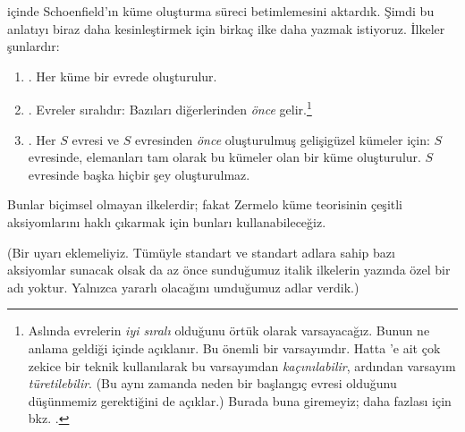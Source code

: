 


 içinde Schoenfield'ın küme oluşturma süreci
betimlemesini aktardık. Şimdi bu anlatıyı biraz daha kesinleştirmek için
birkaç ilke daha yazmak istiyoruz. İlkeler şunlardır:
\begin{enumerate}
\item[] \stageshier. Her küme bir evrede oluşturulur.
\item[] \stagesord. Evreler sıralıdır: Bazıları diğerlerinden \emph{önce}
gelir.\footnote{Aslında evrelerin \emph{iyi sıralı} olduğunu örtük olarak
varsayacağız. Bunun ne anlama geldiği  içinde
açıklanır. Bu önemli bir varsayımdır. Hatta \citet{Scott1974}'e ait çok
zekice bir teknik kullanılarak bu varsayımdan \emph{kaçınılabilir}, ardından
varsayım \emph{türetilebilir}. (Bu aynı zamanda neden bir başlangıç evresi
olduğunu düşünmemiz gerektiğini de açıklar.) Burada buna giremeyiz; daha
fazlası için bkz. \citet{ButtonLT1}.}
\item[] \stagesacc. Her $S$ evresi ve $S$ evresinden \emph{önce}
oluşturulmuş gelişigüzel kümeler için: $S$ evresinde, elemanları tam olarak
bu kümeler olan bir küme oluşturulur. $S$ evresinde başka hiçbir şey
oluşturulmaz.
\end{enumerate}
Bunlar biçimsel olmayan ilkelerdir; fakat Zermelo küme teorisinin çeşitli
aksiyomlarını haklı çıkarmak için bunları kullanabileceğiz.

(Bir uyarı eklemeliyiz. Tümüyle standart ve standart adlara sahip bazı
aksiyomlar sunacak olsak da az önce sunduğumuz italik ilkelerin yazında özel
bir adı yoktur. Yalnızca yararlı olacağını umduğumuz adlar verdik.)

